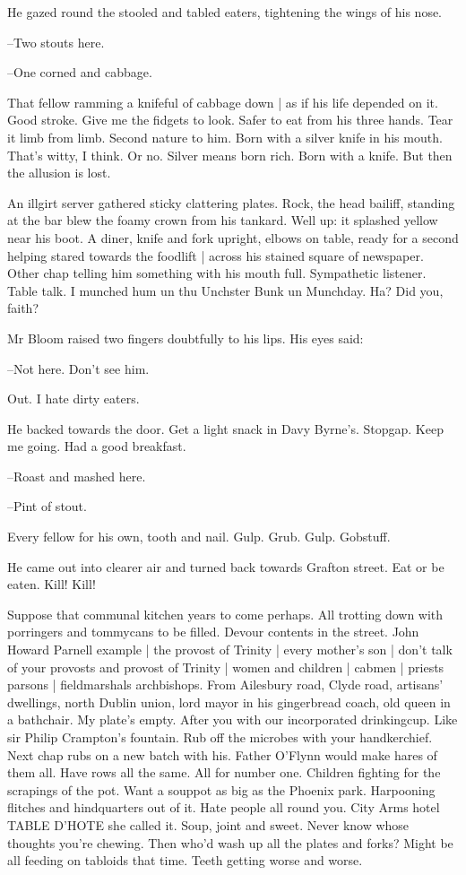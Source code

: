 He gazed round the stooled and tabled eaters,
tightening the wings of his nose.

--Two stouts here.

--One corned and cabbage.

That fellow ramming a knifeful of cabbage down |
as if his life depended on it.
Good stroke.
Give me the fidgets to look.
Safer to eat from his three hands.
Tear it limb from limb.
Second nature to him.
Born with a silver knife in his mouth.
That's witty, I think.
Or no.
Silver means born rich.
Born with a knife.
But then the allusion is lost.

An illgirt server gathered sticky clattering plates.
Rock, the head bailiff,
standing at the bar blew the foamy crown from his tankard.
Well up:
it splashed yellow near his boot.
A diner, knife and fork upright,
elbows on table,
ready for a second helping stared towards the foodlift |
across his stained square of newspaper.
Other chap telling him something with his mouth full.
Sympathetic listener.
Table talk.
I munched hum un thu Unchster Bunk un Munchday.
Ha?
Did you, faith?

Mr Bloom raised two fingers doubtfully to his lips.
His eyes said:

--Not here.
Don't see him.

Out.
I hate dirty eaters.

He backed towards the door.
Get a light snack in Davy Byrne's.
Stopgap.
Keep me going.
Had a good breakfast.

--Roast and mashed here.

--Pint of stout.

Every fellow for his own, tooth and nail.
Gulp.
Grub.
Gulp.
Gobstuff.

He came out into clearer air and turned back towards Grafton street.
Eat or be eaten.
Kill!
Kill!

Suppose that communal kitchen years to come perhaps.
All trotting down with porringers and tommycans to be filled.
Devour contents in the street.
John Howard Parnell example |
the provost of Trinity |
every mother's
son |
don't talk of your provosts and provost of Trinity |
women and children |
cabmen |
priests parsons |
fieldmarshals archbishops.
From Ailesbury road,
Clyde road,
artisans' dwellings,
north Dublin union,
lord mayor in his gingerbread coach,
old queen in a bathchair.
My plate's empty.
After you with our incorporated drinkingcup.
Like sir Philip Crampton's fountain.
Rub off the microbes with your handkerchief.
Next chap rubs on a new batch with his.
Father O'Flynn would make hares of them all.
Have rows all the same.
All for number one.
Children fighting for the scrapings of the pot.
Want a souppot as big as the Phoenix park.
Harpooning flitches and hindquarters out of it.
Hate people all round you.
City Arms hotel
TABLE D'HOTE
she called it.
Soup, joint and sweet.
Never know whose thoughts you're chewing.
Then who'd wash up all the plates and forks?
Might be all feeding on tabloids that time.
Teeth getting worse and worse.

